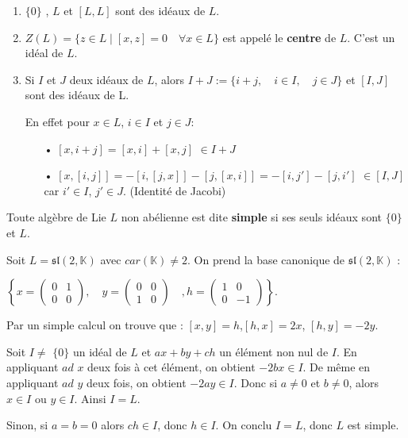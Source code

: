 \documentclass[a4paper,openany,12pt]{report}
\newcommand{\KK}{\mathbb{K}}
\newcommand{\ssl}{\mathfrak{sl}}
\theoremstyle{break}
{\theorembodyfont{\upshape}
\newtheorem*{rmq}{Remarque :}
\newtheorem*{prv}{Preuve :}
\newtheorem*{ex}{Exemples :}
\newtheorem*{exe}{Exemple : }
\newtheorem*{nota}{Notation :}
\newtheorem*{dem}{D\'emonstration :}}
\begin{document}
\begin{ex}
\begin{enumerate}
\item $\{0 \}$ , $L$ et $[L,L]$ sont des idéaux de $L$.

\item $Z(L) = \{ z \in L  \mid [x,z]=0 \quad \forall x \in L\}$ est appelé le \textbf{centre} de $L$. C'est un idéal de $L$.

\item Si $I$ et $J$ deux idéaux de $L$, alors $I+J:=\{i+j,\quad i\in I,\quad j\in J\}$ et $[I,J]$ sont des idéaux de L.

En effet pour $x \in L$, $i \in I$ et $j \in J$:
\begin{itemize}
\item[•] $[x,i+j]=[x,i]+[x,j]$ $\in I+J$
\item[•]$[x,[i,j]]=-[i,[j,x]]-[j,[x,i]] = -[i,j']-[j,i']$ $\in [I,J]$ car $i' \in I$, $j' \in J$. (Identité de Jacobi)
\end{itemize}
\end{enumerate}
\end{ex}

\begin{df}
\quad Toute algèbre de Lie $L$ non abélienne est dite \textbf{simple} si ses seuls idéaux sont $\{ 0 \}$ et $L$.
\end{df}

\begin{exe}
\quad Soit $L = \ssl(2,\KK)$ avec $car(\KK)\ne 2$. On prend la base canonique de $\ssl(2,\KK)$ : 
\begin{center}
$\left \{ x=\begin{pmatrix} 0 & 1\\ 0 & 0 \end{pmatrix},\quad y=\begin{pmatrix} 0 & 0\\ 1 & 0 \end{pmatrix}\quad, h=\begin{pmatrix} 1 & 0\\ 0 & -1 \end{pmatrix} \right \}$.
\end{center} 

Par un simple calcul on trouve que : $[x,y]=h$,\quad $[h,x]=2x$, \quad $[h,y]=-2y$.

Soit $I \ne$ $\{0 \}$ un idéal de $L$ et $ax+by+ch$ un élément non nul de $I$. En appliquant  $ad$ $x$ deux fois à cet élément, on obtient $-2bx\in I$. De même en appliquant $ad$ $y$ deux fois, on obtient $-2ay\in I$. Donc si $a \ne 0$ et $b \ne 0$, alors $x \in I $ ou $y \in I$. Ainsi $I=L$.

Sinon, si $a = b = 0$ alors $ch \in I$, donc $h \in I$. On conclu $I=L$, donc $L$ est simple.
\end{exe}
\end{document}
